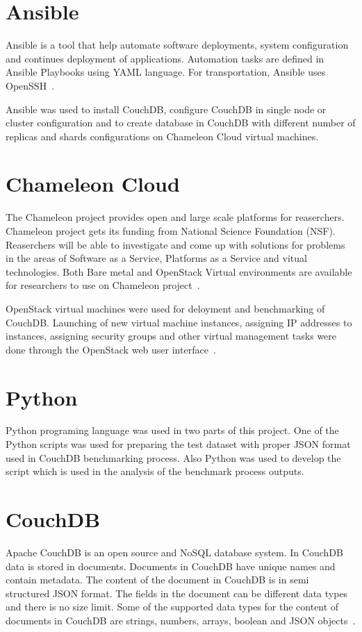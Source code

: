 \section{Ansible}
Ansible is a tool that help automate software deployments, system
configuration and continues deployment of applications. Automation
tasks are defined in Ansible Playbooks using YAML language. For
transportation, Ansible uses OpenSSH~\cite{www-Ansible}. 

Ansible was used to install CouchDB, configure
CouchDB in single node or cluster configuration and to create database
in CouchDB with different number of replicas and shards configurations on
Chameleon Cloud virtual machines.

\section{Chameleon Cloud}

The Chameleon project provides open and large scale platforms for
reaserchers. Chameleon project gets its funding from National Science
Foundation (NSF). Reaserchers will be able to investigate and come up
with solutions for problems in the areas of Software as a Service, Platforms as a
Service and vitual technologies. Both Bare metal and OpenStack Virtual
environments are available for researchers to use on Chameleon
project~\cite{www-Chameleon}. 

OpenStack virtual machines were used for deloyment and benchmarking of
CouchDB. Launching of
new  virtual machine instances, assigning IP addresses to instances,
assigning security groups and other virtual management tasks were done
through the OpenStack web user interface~\cite{www-ChameleonDoc}. 


\section{Python}

Python programing language was used in two parts of this project. One
of the Python scripts was used for  preparing the test dataset with proper JSON format
used in CouchDB benchmarking process. Also Python was used to develop
the script which is used in the analysis of the benchmark process outputs.

\section{CouchDB}

Apache CouchDB is an open source and NoSQL database system. In CouchDB
data is stored in documents. Documents in CouchDB have unique names and contain
metadata. The content of the document in CouchDB is in semi structured
JSON format. The fields in the document can be different data types and there is no size
limit. Some of the supported data types for the content of documents
in CouchDB are strings, numbers, arrays, boolean and JSON objects~\cite{www-Couchdb}. 

